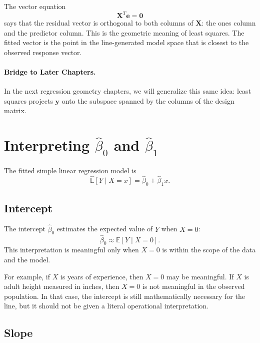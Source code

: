 The vector equation
\begin{equation}
  \mathbf{X}^T\mathbf{e}=\mathbf{0}
\end{equation}
says that the residual vector is orthogonal to both columns of $\mathbf{X}$: the ones column and the predictor column.  This is the geometric meaning of least squares.  The fitted vector is the point in the line-generated model space that is closest to the observed response vector.

\paragraph{Bridge to Later Chapters.}
In the next regression geometry chapters, we will generalize this same idea: least squares projects $\mathbf{y}$ onto the subspace spanned by the columns of the design matrix.

\section{Interpreting \texorpdfstring{$\widehat{\beta}_0$}{beta-hat 0} and \texorpdfstring{$\widehat{\beta}_1$}{beta-hat 1}}

The fitted simple linear regression model is
\begin{equation}
  \widehat{\mathbb{E}}[Y\mid X=x]=\widehat{\beta}_0+\widehat{\beta}_1x.
\end{equation}

\subsection{Intercept}

The intercept $\widehat{\beta}_0$ estimates the expected value of $Y$ when $X=0$:
\begin{equation}
  \widehat{\beta}_0 \approx \mathbb{E}[Y\mid X=0].
\end{equation}
This interpretation is meaningful only when $X=0$ is within the scope of the data and the model.

For example, if $X$ is years of experience, then $X=0$ may be meaningful.  If $X$ is adult height measured in inches, then $X=0$ is not meaningful in the observed population.  In that case, the intercept is still mathematically necessary for the line, but it should not be given a literal operational interpretation.

\subsection{Slope}

